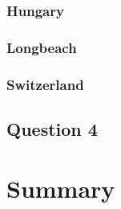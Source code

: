 \documentclass[a4paper]{article}
\begin{document}

% 


\subsubsection{Hungary}

\subsubsection{Longbeach}

\subsubsection{Switzerland}

\subsection{Question 4}

\section{Summary}
\end{document}
